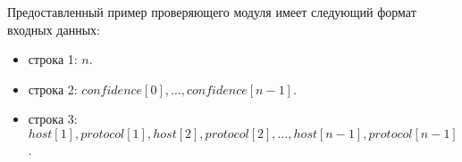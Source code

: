 Предоставленный пример проверяющего модуля имеет следующий формат входных данных:

\begin{itemize}
\item строка 1: $n$.
\item строка 2: $confidence[0], \ldots, confidence[n - 1]$.
\item строка 3: $host[1], protocol[1], host[2], protocol[2], \ldots, host[n - 1], protocol[n - 1]$.
\end{itemize}